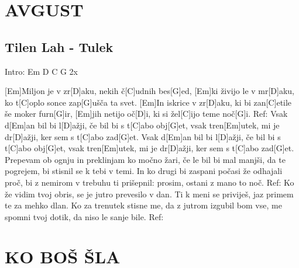 \documentclass{article}
\begin{document}
	
\tableofcontents
\pagebreak
\section*{AVGUST}
%
\subsection*{Tilen Lah - Tulek}

\begin{guitar}
	Intro: Em D C G 2x 

	[Em]Miljon je v zr[D]aku, nekih č[C]udnih bes[G]ed,
	[Em]ki živijo le v mr[D]aku, ko t[C]oplo sonce zap[G]ušča ta svet.
	[Em]In iskrice v zr[D]aku, ki bi zan[C]etile še moker furn[G]ir,
	[Em]jih netijo oč[D]i, ki si žel[C]ijo teme noč[G]i.
	\linebreak
	Ref:
	Vsak d[Em]an bil bi l[D]ažji, če bil bi s t[C]abo obj[G]et, 
	vsak tren[Em]utek, mi je dr[D]ažji, ker sem s t[C]abo zad[G]et.
	Vsak d[Em]an bil bi l[D]ažji, če bil bi s t[C]abo obj[G]et, 
	vsak tren[Em]utek, mi je dr[D]ažji, ker sem s t[C]abo zad[G]et.
	\linebreak
	Prepevam ob ognju in preklinjam ko močno žari, 
	če le bil bi mal manjši, da te pogrejem, bi stisnil se k tebi v temi.
	In ko drugi bi zaspani počasi že odhajali proč, 
	bi z nemirom v trebuhu ti prišepnil: prosim, ostani z mano to noč.
	\linebreak
	Ref:
	\linebreak
	Ko že vidim tvoj obris, se je jutro prevesilo v dan.
	Ti k meni se priviješ, jaz primem te za mehko dlan.
	Ko za trenutek stisne me, da z jutrom izgubil bom vse,
	me spomni tvoj dotik, da niso le sanje bile.
	\linebreak
	Ref:
\end{guitar}

\pagebreak

\section*{KO BOŠ ŠLA}
%
\end{document}
